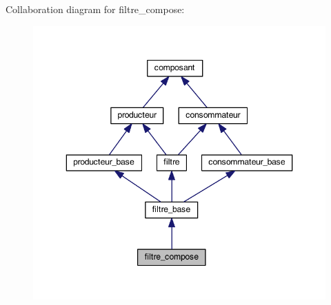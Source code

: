 Collaboration diagram for filtre\-\_\-compose\-:
\nopagebreak
\begin{figure}[H]
\begin{center}
\leavevmode
\includegraphics[width=346pt]{classfiltre__compose__coll__graph}
\end{center}
\end{figure}
